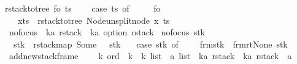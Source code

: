 \begin{isabellebody}
{\isachardoublequoteopen}rstack{\isacharunderscore}to{\isacharunderscore}tree\ fo\ ts\ {\isacharequal}\ {\isacharparenleft}\isanewline
\ \ case\ ts\ of\ \isanewline
\ \ {\isacharbrackleft}{\isacharbrackright}\ {\isasymRightarrow}\ fo\isanewline
\ \ {\isacharbar}\ x{\isacharhash}ts{\isacharprime}\ {\isasymRightarrow}\ {\isacharparenleft}rstack{\isacharunderscore}to{\isacharunderscore}tree\ {\isacharparenleft}Node{\isacharparenleft}unsplit{\isacharunderscore}node\ x{\isacharparenright}{\isacharparenright}\ ts{\isacharprime}\ {\isacharparenright}{\isacharparenright}{\isachardoublequoteclose}\isanewline
\isanewline
\isanewline
\isanewline
{}\isamarkupfalse%
\ no{\isacharunderscore}focus\ {\isacharcolon}{\isacharcolon}\ {\isachardoublequoteopen}{\isacharparenleft}{\isacharprime}k{\isacharcomma}{\isacharprime}a{\isacharparenright}\ rstack\ {\isasymRightarrow}\ {\isacharparenleft}{\isacharprime}k{\isacharcomma}{\isacharprime}a\ option{\isacharparenright}\ rstack{\isachardoublequoteclose}\ \isanewline
{\isachardoublequoteopen}no{\isacharunderscore}focus\ stk\ {\isacharequal}\ {\isacharparenleft}\isanewline
\ \ stk\ {\isacharbar}{\isachargreater}\ rstack{\isacharunderscore}map\ Some\ {\isacharbar}{\isachargreater}\ {\isacharparenleft}{\isacharpercent}\ stk{\isachardot}\ \isanewline
\ \ case\ stk\ of\ {\isacharbrackleft}{\isacharbrackright}\ {\isasymRightarrow}\ {\isacharbrackleft}{\isacharbrackright}\ {\isacharbar}\ frm{\isacharhash}stk{\isacharprime}\ {\isasymRightarrow}\ {\isacharparenleft}frm{\isasymlparr}r{\isacharunderscore}t{\isacharcolon}{\isacharequal}None\ {\isasymrparr}{\isacharparenright}{\isacharhash}stk{\isacharprime}{\isacharparenright}{\isacharparenright}{\isachardoublequoteclose}\isanewline
\isanewline
\isanewline
\isanewline
\isanewline
\isanewline
{}\isamarkupfalse%
\ add{\isacharunderscore}new{\isacharunderscore}stack{\isacharunderscore}frame\ {\isacharcolon}{\isacharcolon}\ \isanewline
\ \ {\isachardoublequoteopen}{\isacharprime}k\ ord\ {\isacharequal}{\isachargreater}\ {\isacharprime}k\ {\isasymRightarrow}\ {\isacharparenleft}{\isacharprime}k\ list\ {\isacharasterisk}\ {\isacharprime}a\ list{\isacharparenright}\ {\isasymRightarrow}\ {\isacharparenleft}{\isacharprime}k{\isacharcomma}{\isacharprime}a{\isacharparenright}\ rstack\ {\isasymRightarrow}\ {\isacharparenleft}{\isacharparenleft}{\isacharprime}k{\isacharcomma}{\isacharprime}a{\isacharparenright}\ rstack\ {\isacharasterisk}\ {\isacharprime}a{\isacharparenright}{\isachardoublequoteclose}\ \isanewline
{}\isanewline

\end{isabellebody}
